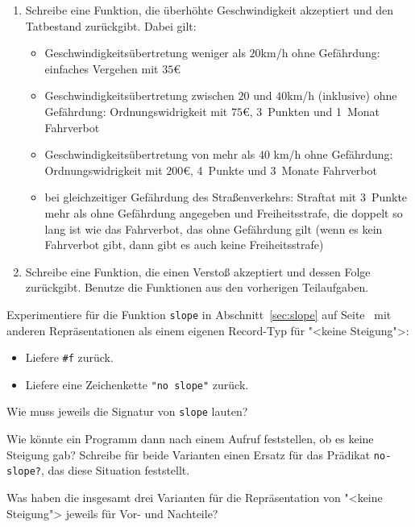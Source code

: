 \begin{aufgabe}
\begin{enumerate}
  \item Schreibe eine Funktion, die überhöhte
    Geschwindigkeit akzeptiert und den Tatbestand zurückgibt.  Dabei
    gilt:
    \begin{itemize}
    \item Geschwindigkeitsübertretung weniger als $20$km/h ohne Gefährdung:
      einfaches Vergehen mit $35$€
    \item Geschwindigkeitsübertretung zwischen $20$ und $40$km/h
      (inklusive) ohne Gefährdung: Ordnungswidrigkeit mit $75$€,
      3~Punkten und 1~Monat Fahrverbot
    \item Geschwindigkeitsübertretung von mehr als 40 km/h ohne
      Gefährdung: Ordnungswidrigkeit mit $200$€, 4~Punkte und
      3~Monate Fahrverbot
    \item bei gleichzeitiger Gefährdung des Straßenverkehrs: Straftat
      mit 3~Punkte mehr als ohne Gefährdung angegeben und
      Freiheitsstrafe, die doppelt so lang ist wie das Fahrverbot, das
      ohne Gefährdung gilt (wenn es kein Fahrverbot gibt, dann gibt es
      auch keine Freiheitsstrafe)
    \end{itemize}

  \item Schreibe eine Funktion, die einen
    Verstoß akzeptiert und dessen Folge zurückgibt.  Benutze die
    Funktionen aus den vorherigen Teilaufgaben.
  \end{enumerate}
\end{aufgabe}

\begin{aufgabe}\label{aufgabe:no-slope}
  Experimentiere für die Funktion \lstinline{slope} in
  Abschnitt~\ref{sec:slope} auf Seite~\pageref{sec:slope}
  mit anderen Repräsentationen als einem eigenen
  Record-Typ für "<keine Steigung">:
  \begin{itemize}
  \item Liefere \lstinline{#f} zurück.
  \item Liefere eine Zeichenkette \lstinline{"no slope"} zurück.
  \end{itemize}
  Wie muss jeweils die Signatur von \lstinline{slope} lauten?
  
  Wie könnte ein Programm dann nach einem Aufruf feststellen, ob es
  keine Steigung gab?  Schreibe für beide Varianten einen Ersatz für das Prädikat
  \lstinline{no-slope?}, das diese Situation feststellt.

  Was haben die insgesamt drei Varianten für die Repräsentation von
  "<keine Steigung"> jeweils für Vor- und Nachteile?
\end{aufgabe}

